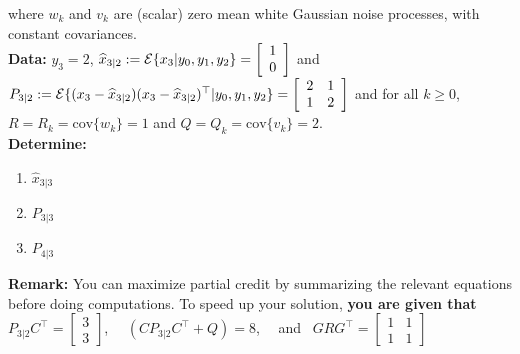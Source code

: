 \documentclass[letterpaper]{article}
\newcommand{\cov}{\mathrm{cov}}
\newcommand{\Expectof}[1]{{\cal E} \{ #1 \}}
\newcommand{\ExpectofGiven}[2]{{\cal E} \{ #1 | #2 \}}
\begin{document}
where $w_k$ and $v_k$ are (scalar) zero mean white Gaussian noise processes, with constant covariances.\\




\noindent \textbf{Data:}  $y_3=2$,  $\widehat{x}_{3|2}:=\ExpectofGiven{x_3}{y_0, y_1, y_2}= \left[ \begin{array}{c} 1 \\ 0\end{array} \right]$ and $P_{3|2}:=\ExpectofGiven{(x_{3}-\widehat{x}_{3|2})(x_{3}-\widehat{x}_{3|2})^\top}{y_0, y_1, y_2} =\left[ \begin{array}{rr} 2 & 1\\ 1 & 2\end{array} \right] $ and for all $k\ge 0$, $R=R_k=\cov\{w_k\}=1$ and $Q=Q_k=\cov\{v_k\}=2$.\\

\noindent \textbf{Determine:}

\begin{enumerate}
\setlength{\itemsep}{.15in}
\renewcommand{\labelenumi}{(\alph{enumi})}
\setlength{\itemsep}{.1in}
\item $\widehat{x}_{3|3}$
\item $P_{3|3}$
\item $P_{4|3}$
\end{enumerate}

\noindent \textbf{Remark:} You can maximize partial credit by summarizing the relevant equations before doing computations. To speed up your solution, \textbf{you are given that} $P_{3|2} C^\top =  \left[ \begin{array}{c} 3 \\ 3\end{array} \right]$,~~ $\left(C P_{3|2} C^\top + Q\right)=8$, ~~and ~$GRG^\top = \left[ \begin{array}{rr} 1 & 1\\ 1 & 1\end{array} \right]$\\ \\


~~~~~~~~~~~~~~~~~~~~~\\
\end{document}

